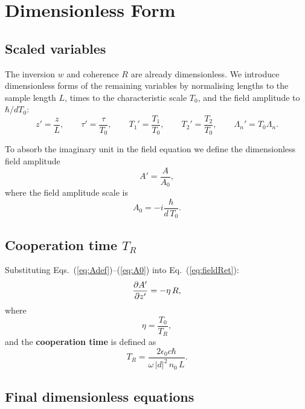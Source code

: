 \documentclass[12pt,a4paper]{article}
\newcommand{\T}{T_0}
\begin{document}
\section{Dimensionless Form}

\subsection{Scaled variables}

The inversion $w$ and coherence $R$ are already dimensionless. We introduce
dimensionless forms of the remaining variables by normalising lengths to the
sample length $L$, times to the characteristic scale $\T$, and the field
amplitude to $\hbar/d\T$:
\begin{equation}
  z' = \frac{z}{L}, \qquad \tau' = \frac{\tau}{\T},
  \qquad T_1' = \frac{T_1}{\T}, \qquad T_2' = \frac{T_2}{\T},
  \qquad \Lambda_n' = \T\Lambda_n.
\end{equation}

To absorb the imaginary unit in the field equation we define the
dimensionless field amplitude
\begin{equation}
  A' = \frac{A}{A_0},
  \label{eq:Adef}
\end{equation}
where the field amplitude scale is
\begin{equation}
  A_0 = -i\frac{\hbar}{d\,\T}.
  \label{eq:A0}
\end{equation}

\subsection{\texorpdfstring{Cooperation time $T_R$}{Cooperation time T\_R}}

Substituting Eqs.~(\ref{eq:Adef})--(\ref{eq:A0}) into
Eq.~(\ref{eq:fieldRet}):
\begin{equation}
  \dfrac{\partial A'}{\partial z'} = -\eta\,R,
\end{equation}
where
\begin{equation}
  \eta = \frac{\T}{T_R},
  \label{eq:eta}
\end{equation}
and the \textbf{cooperation time} is defined as
\begin{equation}
  \boxed{T_R = \frac{2\epsilon_0 c\hbar}{\omega\,|d|^2\,n_0\,L}.}
  \label{eq:TR}
\end{equation}

\subsection{Final dimensionless equations}
\end{document}
